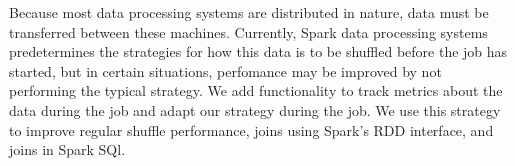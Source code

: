 % 
% 
%

Because most data processing systems are distributed in nature, data must be transferred
between these machines. Currently, Spark data processing systems predetermines the strategies for how this data is to be shuffled
before the job has started, but in certain situations, perfomance may be improved by not performing the typical strategy.
We add functionality to track metrics about the  data during the job and adapt our strategy during the job.
We use this strategy to improve regular shuffle performance,  joins using Spark's RDD interface, and joins in Spark SQl.
